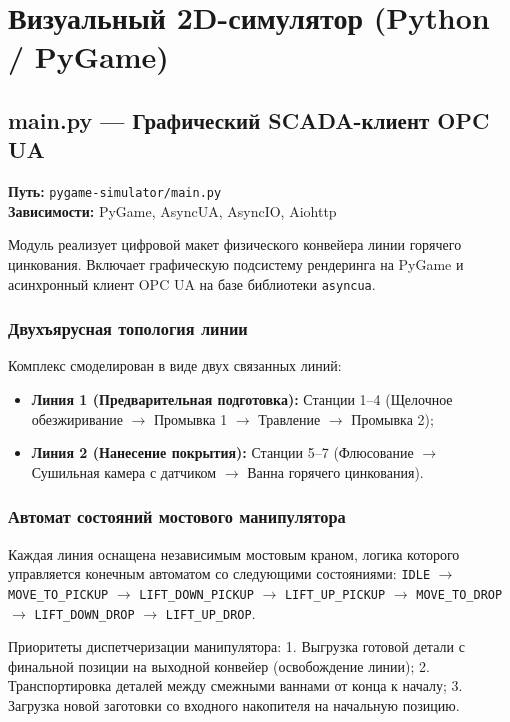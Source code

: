 \documentclass[14pt, a4paper]{extarticle}
\begin{document}
\newpage
\section{Визуальный 2D-симулятор (Python / PyGame)}

\subsection{main.py --- Графический SCADA-клиент OPC UA}

\textbf{Путь:} \texttt{pygame-simulator/main.py}\\
\textbf{Зависимости:} PyGame, AsyncUA, AsyncIO, Aiohttp

Модуль реализует цифровой макет физического конвейера линии горячего цинкования. Включает графическую подсистему рендеринга на PyGame и асинхронный клиент OPC UA на базе библиотеки \texttt{asyncua}.

\subsubsection{Двухъярусная топология линии}
Комплекс смоделирован в виде двух связанных линий:
\begin{itemize}
    \item \textbf{Линия 1 (Предварительная подготовка):} Станции 1--4 (Щелочное обезжиривание $\to$ Промывка 1 $\to$ Травление $\to$ Промывка 2);
    \item \textbf{Линия 2 (Нанесение покрытия):} Станции 5--7 (Флюсование $\to$ Сушильная камера с датчиком $\to$ Ванна горячего цинкования).
\end{itemize}

\subsubsection{Автомат состояний мостового манипулятора}
Каждая линия оснащена независимым мостовым краном, логика которого управляется конечным автоматом со следующими состояниями:
\texttt{IDLE} $\to$ \texttt{MOVE\_TO\_PICKUP} $\to$ \texttt{LIFT\_DOWN\_PICKUP} $\to$ \texttt{LIFT\_UP\_PICKUP} $\to$ \texttt{MOVE\_TO\_DROP} $\to$ \texttt{LIFT\_DOWN\_DROP} $\to$ \texttt{LIFT\_UP\_DROP}.

Приоритеты диспетчеризации манипулятора:
1. Выгрузка готовой детали с финальной позиции на выходной конвейер (освобождение линии);
2. Транспортировка деталей между смежными ваннами от конца к началу;
3. Загрузка новой заготовки со входного накопителя на начальную позицию.
\end{document}
